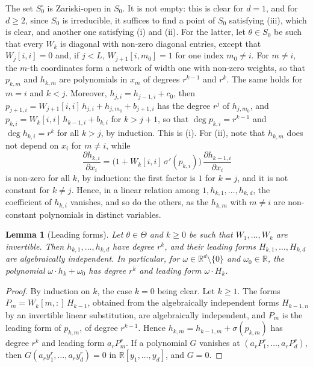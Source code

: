 \documentclass[11pt]{article}
\newtheorem{lemma}{Lemma}
\theoremstyle{definition}
\theoremstyle{remark}
\newcommand{\R}{\mathbb{R}}
\newcommand{\sm}{\setminus}
\begin{document}
The set $S_0^\circ$ is Zariski-open in $S_0$. It is not empty: this is clear for $d=1$, and for $d\ge2$, since $S_0$ is irreducible, it suffices to find a point of $S_0$ satisfying (iii), which is clear, and another one satisfying (i) and (ii). For the latter, let $\theta\in S_0$ be such that every $W_k$ is diagonal with non-zero diagonal entries, except that $W_j[i,i]=0$ and, if $j<L$, $W_{j+1}[i,m_0]=1$ for one index $m_0\ne i$. For $m\ne i$, the $m$-th coordinates form a network of width one with non-zero weights, so that $p_{k,m}$ and $h_{k,m}$ are polynomials in $x_m$ of degrees $r^{k-1}$ and $r^k$. The same holds for $m=i$ and $k<j$. Moreover, $h_{j,i}=h_{j-1,i}+c_0$, then $p_{j+1,i}=W_{j+1}[i,i]\,h_{j,i}+h_{j,m_0}+b_{j+1,i}$ has the degree $r^j$ of $h_{j,m_0}$, and $p_{k,i}=W_k[i,i]\,h_{k-1,i}+b_{k,i}$ for $k>j+1$, so that $\deg p_{k,i}=r^{k-1}$ and $\deg h_{k,i}=r^k$ for all $k>j$, by induction. This is (i). For (ii), note that $h_{k,m}$ does not depend on $x_i$ for $m\ne i$, while
\[
\frac{\partial h_{k,i}}{\partial x_i}=\big(1+W_k[i,i]\,\sigma'(p_{k,i})\big)\,\frac{\partial h_{k-1,i}}{\partial x_i}
\]
is non-zero for all $k$, by induction: the first factor is $1$ for $k=j$, and it is not constant for $k\ne j$. Hence, in a linear relation among $1,h_{k,1},\dots,h_{k,d}$, the coefficient of $h_{k,i}$ vanishes, and so do the others, as the $h_{k,m}$ with $m\ne i$ are non-constant polynomials in distinct variables.

\begin{lemma}[Leading forms]\label{lem:leading}
Let $\theta\in\Theta$ and $k\ge0$ be such that $W_1,\dots,W_k$ are invertible. Then $h_{k,1},\dots,h_{k,d}$ have degree $r^k$, and their leading forms $H_{k,1},\dots,H_{k,d}$ are algebraically independent. In particular, for $\omega\in\R^d\sm\{0\}$ and $\omega_0\in\R$, the polynomial $\omega\cdot h_k+\omega_0$ has degree $r^k$ and leading form $\omega\cdot H_k$.
\end{lemma}

\begin{proof}
By induction on $k$, the case $k=0$ being clear. Let $k\ge1$. The forms $P_m=W_k[m,:]\,H_{k-1}$, obtained from the algebraically independent forms $H_{k-1,n}$ by an invertible linear substitution, are algebraically independent, and $P_m$ is the leading form of $p_{k,m}$, of degree $r^{k-1}$. Hence $h_{k,m}=h_{k-1,m}+\sigma(p_{k,m})$ has degree $r^k$ and leading form $a_rP_m^r$. If a polynomial $G$ vanishes at $(a_rP_1^r,\dots,a_rP_d^r)$, then $G(a_ry_1^r,\dots,a_ry_d^r)=0$ in $\R[y_1,\dots,y_d]$, and $G=0$.
\end{proof}
\end{document}
